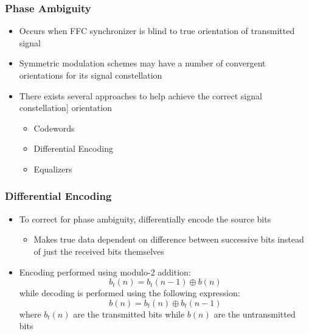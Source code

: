 \documentclass[10pt]{beamer}
\begin{document}

\frame
{
  \frametitle{Phase Ambiguity}
  
  \begin{itemize}
   \item Occurs when FFC synchronizer is blind to true orientation of transmitted signal
   \item Symmetric modulation schemes may have a number of convergent orientations for its signal constellation 
   \item There exists several approaches to help achieve the correct signal constellation] orientation
   \begin{itemize}
    \item Codewords
    \item Differential Encoding
    \item Equalizers
   \end{itemize}
  \end{itemize}

  
}


\frame
{
  \frametitle{Differential Encoding}
  
  \begin{itemize}
   \item To correct for phase ambiguity, differentially encode the source bits
   \begin{itemize}
    \item Makes true data dependent on difference between successive bits instead of just the received bits themselves
   \end{itemize}
    \item Encoding performed using modulo-2 addition:
    \begin{equation}
     b_t(n)=b_t(n-1)\oplus{b(n)}
    \end{equation}
    while decoding is performed using the following expression:
    \begin{equation}
     b(n)=b_t(n)\oplus{b_t(n-1)}
    \end{equation}
    where $b_t(n)$ are the transmitted bits while $b(n)$ are the untransmitted bits
  \end{itemize}

  
}

\end{document}
